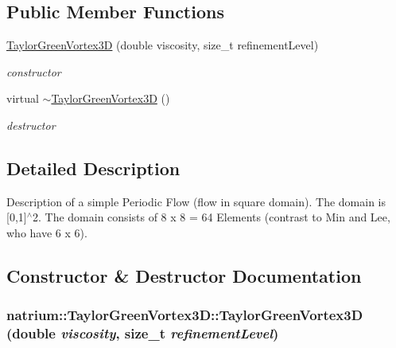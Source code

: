 \subsection*{Public Member Functions}
\begin{DoxyCompactItemize}
\item 
\hyperlink{classnatrium_1_1TaylorGreenVortex3D_ac0f6f0036c2c42c65cbbb7f4eaa359ed}{TaylorGreenVortex3D} (double viscosity, size\_\-t refinementLevel)
\begin{DoxyCompactList}\small\item\em constructor \item\end{DoxyCompactList}\item 
\hypertarget{classnatrium_1_1TaylorGreenVortex3D_a1cc6d70f1b2610383f81b8d1109b6ae9}{
virtual \hyperlink{classnatrium_1_1TaylorGreenVortex3D_a1cc6d70f1b2610383f81b8d1109b6ae9}{$\sim$TaylorGreenVortex3D} ()}
\label{classnatrium_1_1TaylorGreenVortex3D_a1cc6d70f1b2610383f81b8d1109b6ae9}

\begin{DoxyCompactList}\small\item\em destructor \item\end{DoxyCompactList}\end{DoxyCompactItemize}


\subsection{Detailed Description}
Description of a simple Periodic Flow (flow in square domain). The domain is \mbox{[}0,1\mbox{]}$^\wedge$2. The domain consists of 8 x 8 = 64 Elements (contrast to Min and Lee, who have 6 x 6). 

\subsection{Constructor \& Destructor Documentation}
\hypertarget{classnatrium_1_1TaylorGreenVortex3D_ac0f6f0036c2c42c65cbbb7f4eaa359ed}{
\subsubsection[{TaylorGreenVortex3D}]{\setlength{\rightskip}{0pt plus 5cm}natrium::TaylorGreenVortex3D::TaylorGreenVortex3D (double {\em viscosity}, \/  size\_\-t {\em refinementLevel})}}
\label{classnatrium_1_1TaylorGreenVortex3D_ac0f6f0036c2c42c65cbbb7f4eaa359ed}


